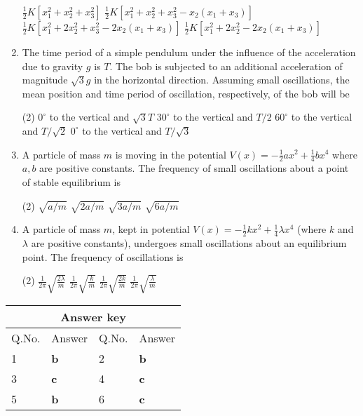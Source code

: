 \begin{enumerate}
\begin{tasks}
	\task[\textbf{A.}] $\frac{1}{2} K\left[x_{1}^{2}+x_{2}^{2}+x_{3}^{2}\right]$
	\task[\textbf{B.}]$\frac{1}{2} K\left[x_{1}^{2}+x_{2}^{2}+x_{3}^{2}-x_{2}\left(x_{1}+x_{3}\right)\right]$
	\task[\textbf{C.}]$\frac{1}{2} K\left[x_{1}^{2}+2 x_{2}^{2}+x_{3}^{2}-2 x_{2}\left(x_{1}+x_{3}\right)\right]$
	\task[\textbf{D.}]$\frac{1}{2} K\left[x_{1}^{2}+2 x_{2}^{2}-2 x_{2}\left(x_{1}+x_{3}\right)\right]$
\end{tasks}
	\item The time period of a simple pendulum under the influence of the acceleration due to gravity $g$ is $T$. The bob is subjected to an additional acceleration of magnitude $\sqrt{3} g$ in the horizontal direction. Assuming small oscillations, the mean position and time period of oscillation, respectively, of the bob will be
	{}
\begin{tasks}(2)
	\task[\textbf{A.}] $0^{\circ}$ to the vertical and $\sqrt{3} T$
	\task[\textbf{B.}]$30^{\circ}$ to the vertical and $T / 2$
	\task[\textbf{C.}]$60^{\circ}$ to the vertical and $T / \sqrt{2}$
	\task[\textbf{D.}]$0^{\circ}$ to the vertical and $T / \sqrt{3}$
\end{tasks}
	\item A particle of mass $m$ is moving in the potential $V(x)=-\frac{1}{2} a x^{2}+\frac{1}{4} b x^{4}$ where $a, b$ are positive constants. The frequency of small oscillations about a point of stable equilibrium is
	{}
\begin{tasks}(2)
	\task[\textbf{A.}] $\sqrt{a / m}$
	\task[\textbf{B.}]$\sqrt{2 a / m}$
	\task[\textbf{C.}]$\sqrt{3 a / m}$
	\task[\textbf{D.}]$\sqrt{6 a / m}$
\end{tasks}
	\item A particle of mass $m$, kept in potential $V(x)=-\frac{1}{2} k x^{2}+\frac{1}{4} \lambda x^{4}$ (where $k$ and $\lambda$ are positive constants), undergoes small oscillations about an equilibrium point. The frequency of oscillations is
	{}
\begin{tasks}(2)
	\task[\textbf{A.}] $\frac{1}{2 \pi} \sqrt{\frac{2 \lambda}{m}}$
	\task[\textbf{B.}]$\frac{1}{2 \pi} \sqrt{\frac{k}{m}}$
	\task[\textbf{C.}]$\frac{1}{2 \pi} \sqrt{\frac{2 k}{m}}$
	\task[\textbf{D.}]$\frac{1}{2 \pi} \sqrt{\frac{\lambda}{m}}$
\end{tasks}
 \end{enumerate}
\setlength\arrayrulewidth{1pt}
\begin{table}[H]
	\centering
	
	\begin{tabular}{|p{1.5cm}|p{1.5cm}||p{1.5cm}|p{1.5cm}|}
		\hline
		\multicolumn{4}{|c|}{\textbf{Answer key}}\\\hline\hline
		\rowcolor{ocrel}Q.No.&Answer&Q.No.&Answer\\\hline
		1&\textbf{b}&2&\textbf{b}\\\hline
		3&\textbf{c}&4&\textbf{c}\\\hline
		5&\textbf{b}&6&\textbf{c}\\\hline
	\end{tabular}
\end{table}

